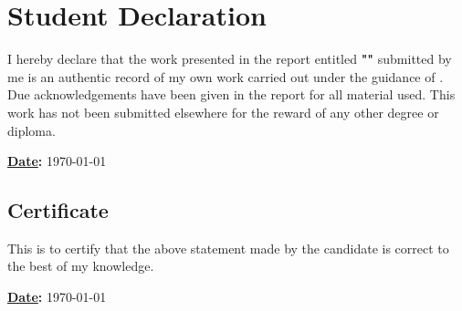 \chapter*{\centering \huge Student Declaration}

\begin{minipage}{\textwidth}
    \begin{flushleft}  
        I hereby declare that the work presented in the report entitled 
        \textbf{"\projTitle"} submitted by me is an authentic record of my own 
        work carried out under the guidance of 
        \textbf{\advisorone}. 
        Due acknowledgements have been given in the report for all material used. 
        This work has not been submitted elsewhere for the reward of any other degree or diploma.

        \vspace{0.5in}

        \textbf{\projAuthorOneName} \hfill
        {\textbf{\underline{Date}:} \today} \\ 

    \end{flushleft}
\end{minipage}

\vfill

\begin{minipage}{\textwidth}
    \begin{flushleft}
        {\let\clearpage\relax\chapter*{\centering \huge Certificate}}

        This is to certify that the above statement made by the candidate 
        is correct to the best of my knowledge.

        \vspace{0.4in}

        \begin{minipage}{0.45\textwidth}
            \begin{flushleft}
                \textbf{\advisorone}
            \end{flushleft}
        \end{minipage}%
        \hfill
        \begin{minipage}{0.45\textwidth}
            \textbf{\underline{Date}:} \today
        \end{minipage}%
    \end{flushleft}
\end{minipage}
